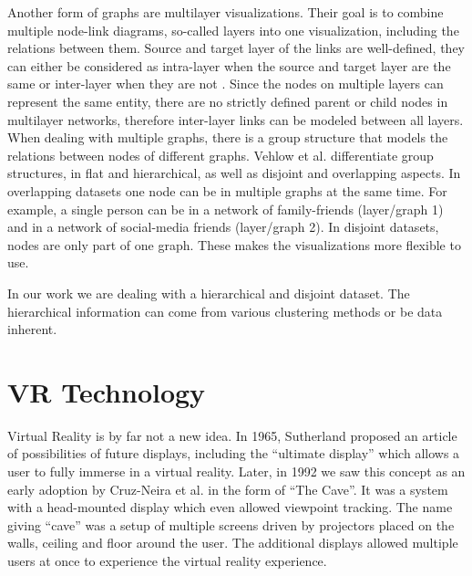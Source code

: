 Another form of graphs are multilayer visualizations\label{exp:multilayer}. Their goal is to combine multiple node-link diagrams, so-called layers into one visualization, including the relations between them. 
Source and target layer of the links are well-defined, they can either be considered as intra-layer when the source and target layer are the same or inter-layer when they are not \cite{ghoniem_state_2019}. 
Since the nodes on multiple layers can represent the same entity, there are no strictly defined parent or child nodes in multilayer networks, therefore inter-layer links can be modeled between all layers.
When dealing with multiple graphs, there is a group structure that models the relations between nodes of different graphs.
Vehlow et al. \cite{vehlow_state_2015} differentiate group structures, in flat and hierarchical, as well as disjoint and overlapping aspects.
In overlapping datasets one node can be in multiple graphs at the same time. For example, a single person can be in a network of family-friends (layer/graph 1) and in a network of social-media friends (layer/graph 2).
In disjoint datasets, nodes are only part of one graph. These makes the visualizations more flexible to use.
\pagebreak

In our work we are dealing with a hierarchical and disjoint dataset. The hierarchical information can come from various clustering methods or be data inherent.

\section{VR Technology}
\label{chap:bg-vrtech}
Virtual Reality is by far not a new idea. In 1965, Sutherland \cite{Sutherland65theultimate} proposed an article of possibilities of future displays, including the “ultimate display” which allows a user to fully immerse in a virtual reality. Later, in 1992 we saw this concept as an early adoption by Cruz-Neira et al. \cite{cruz-neira_cave_1992} in the form of “The Cave”. It was a system with a head-mounted display which even allowed viewpoint tracking. The name giving “cave” was a setup of multiple screens driven by projectors placed on the walls, ceiling and floor around the user. The additional displays allowed multiple users at once to experience the virtual reality experience.  

